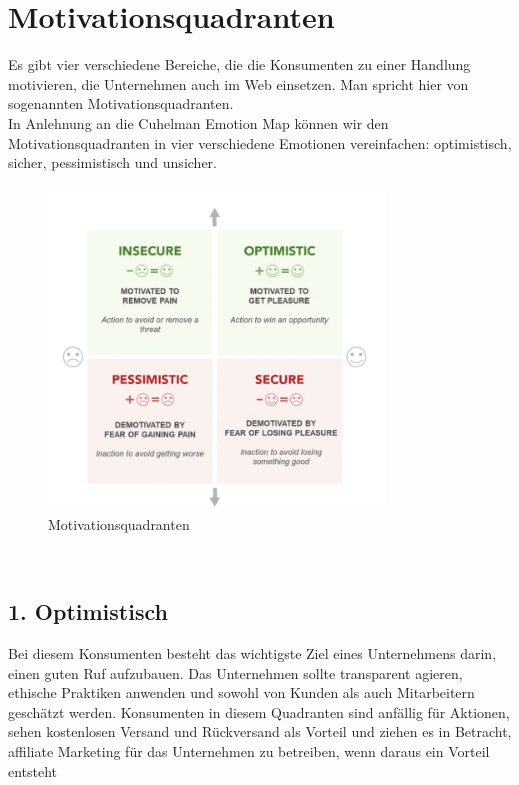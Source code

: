 \documentclass[./dokumentation.tex]{subfiles}
\begin{document}
\section{Motivationsquadranten}
Es gibt vier verschiedene Bereiche, die die Konsumenten zu einer Handlung motivieren, die Unternehmen auch im Web einsetzen. Man spricht hier von sogenannten Motivationsquadranten. \\
In Anlehnung an die Cuhelman Emotion Map können wir den Motivationsquadranten in vier verschiedene Emotionen vereinfachen: optimistisch, sicher, pessimistisch und unsicher. \\

\begin{figure}[H]
    \centering
    \includegraphics[width=0.8\textwidth]{bilder/motivationsquadranten.png}
    \caption{Motivationsquadranten \cite{designbro}}
    \label{fig9:motivationsquadranten}
\end{figure}\\

\subsection{1. Optimistisch}
Bei diesem Konsumenten besteht das wichtigste Ziel eines Unternehmens darin, einen guten Ruf aufzubauen. Das Unternehmen sollte transparent agieren, ethische Praktiken anwenden und sowohl von Kunden als auch Mitarbeitern geschätzt werden. Konsumenten in diesem Quadranten sind anfällig für Aktionen, sehen kostenlosen Versand und Rückversand als Vorteil und ziehen es in Betracht, affiliate Marketing für das Unternehmen zu betreiben, wenn daraus ein Vorteil entsteht \cite{designbro} \\
 
\end{document}
